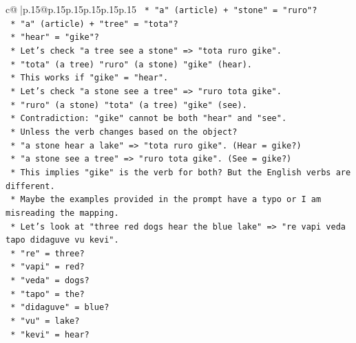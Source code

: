 \documentclass{article}
\begin{document}
{\begin{supertabular}{c@{$\;$}|p{.15\linewidth}@{}p{.15\linewidth}p{.15\linewidth}p{.15\linewidth}p{.15\linewidth}p{.15\linewidth}}
{{{\texttt{                        *   "a" (article) + "stone" = "ruro"?} \\
\texttt{                        *   "a" (article) + "tree" = "tota"?} \\
\texttt{                        *   "hear" = "gike"?} \\
\texttt{                    *   Let's check "a tree see a stone" => "tota ruro gike".} \\
\texttt{                        *   "tota" (a tree) "ruro" (a stone) "gike" (hear).} \\
\texttt{                        *   This works if "gike" = "hear".} \\
\texttt{                    *   Let's check "a stone see a tree" => "ruro tota gike".} \\
\texttt{                        *   "ruro" (a stone) "tota" (a tree) "gike" (see).} \\
\texttt{                        *   Contradiction: "gike" cannot be both "hear" and "see".} \\
\texttt{                    *   Unless the verb changes based on the object?} \\
\texttt{                        *   "a stone hear a lake" => "tota ruro gike". (Hear = gike?)} \\
\texttt{                        *   "a stone see a tree" => "ruro tota gike". (See = gike?)} \\
\texttt{                        *   This implies "gike" is the verb for both? But the English verbs are different.} \\
\texttt{                    *   Maybe the examples provided in the prompt have a typo or I am misreading the mapping.} \\
\texttt{                    *   Let's look at "three red dogs hear the blue lake" => "re vapi veda tapo didaguve vu kevi".} \\
\texttt{                        *   "re" = three?} \\
\texttt{                        *   "vapi" = red?} \\
\texttt{                        *   "veda" = dogs?} \\
\texttt{                        *   "tapo" = the?} \\
\texttt{                        *   "didaguve" = blue?} \\
\texttt{                        *   "vu" = lake?} \\
\texttt{                        *   "kevi" = hear?} \\
}}}
\end{supertabular}}
\end{document}
